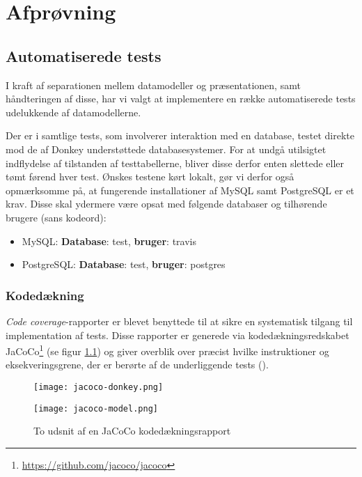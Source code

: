 \chapter{Afprøvning}
\label{chapter:afproevning}

\section{Automatiserede tests}

I kraft af separationen mellem datamodeller og præsentationen, samt håndteringen af disse, har vi valgt at implementere en række automatiserede tests udelukkende af datamodellerne.

Der er i samtlige tests, som involverer interaktion med en database, testet direkte mod de af Donkey understøttede databasesystemer. For at undgå utilsigtet indflydelse af tilstanden af testtabellerne, bliver disse derfor enten slettede eller tømt førend hver test. Ønskes testene kørt lokalt, gør vi derfor også opmærksomme på, at fungerende installationer af MySQL samt PostgreSQL er et krav. Disse skal ydermere være opsat med følgende databaser og tilhørende brugere (sans kodeord):

\begin{itemize}
  \item MySQL: \textbf{Database}: test, \textbf{bruger}: travis
  \item PostgreSQL: \textbf{Database}: test, \textbf{bruger}: postgres
\end{itemize}

\subsection{Kodedækning}
\label{subsection:kodedeakning}

\textit{Code coverage}-rapporter er blevet benyttede til at sikre en systematisk tilgang til implementation af tests. Disse rapporter er generede via kodedækningsredskabet JaCoCo\footnote{\url{https://github.com/jacoco/jacoco}} (se figur \ref{code-coverage:donkey}) og giver overblik over præcist hvilke instruktioner og eksekveringsgrene, der er berørte af de underliggende tests (\cite{wiki:code-cov}).

\begin{figure}[h]
  \begin{minipage}[b]{0.45\linewidth}
    \centering
    \texttt{[image: jacoco-donkey.png]}
  \end{minipage}
  \hspace{0.5cm}
  \begin{minipage}[b]{0.45\linewidth}
    \centering
    \texttt{[image: jacoco-model.png]}
  \end{minipage}
  
  \caption{To udsnit af en JaCoCo kodedækningsrapport}
  \label{code-coverage:donkey}
\end{figure}

